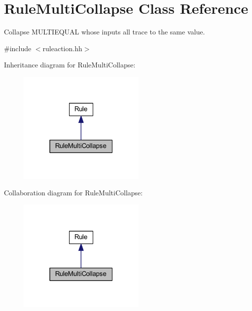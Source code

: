 \hypertarget{class_rule_multi_collapse}{}\section{Rule\+Multi\+Collapse Class Reference}
\label{class_rule_multi_collapse}


Collapse M\+U\+L\+T\+I\+E\+Q\+U\+AL whose inputs all trace to the same value.  




{\ttfamily \#include $<$ruleaction.\+hh$>$}



Inheritance diagram for Rule\+Multi\+Collapse\+:
\nopagebreak
\begin{figure}[H]
\begin{center}
\leavevmode
\includegraphics[width=175pt]{class_rule_multi_collapse__inherit__graph}
\end{center}
\end{figure}


Collaboration diagram for Rule\+Multi\+Collapse\+:
\nopagebreak
\begin{figure}[H]
\begin{center}
\leavevmode
\includegraphics[width=175pt]{class_rule_multi_collapse__coll__graph}
\end{center}
\end{figure}
